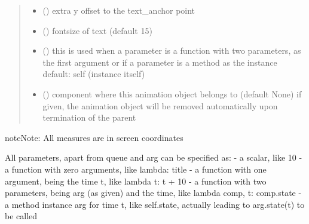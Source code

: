 \documentclass[letterpaper,10pt,english]{sphinxmanual}
\begin{document}
\begin{fulllineitems}
\begin{quote}
\begin{description}
\begin{itemize}
\item {} 
 () \textendash{} extra y offset to the text\_anchor point

\item {} 
 () \textendash{} fontsize of text (default 15)

\item {} 
 () \textendash{} this is used when a parameter is a function with two parameters, as the first argument or
if a parameter is a method as the instance 
default: self (instance itself)

\item {} 
 ({\hyperref[\detokenize{Reference:salabim.Component}]{}}) \textendash{} component where this animation object belongs to (default None) 
if given, the animation object will be removed
automatically upon termination of the parent

\end{itemize}

\end{description}\end{quote}

\begin{sphinxadmonition}{note}{Note:}
All measures are in screen coordinates 

All parameters, apart from queue and arg can be specified as: 
- a scalar, like 10 
- a function with zero arguments, like lambda: title 
- a function with one argument, being the time t, like lambda t: t + 10 
- a function with two parameters, being arg (as given) and the time, like lambda comp, t: comp.state 
- a method instance arg for time t, like self.state, actually leading to arg.state(t) to be called
\end{sphinxadmonition}

\end{fulllineitems}

\end{document}
